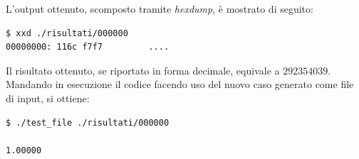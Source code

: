\documentclass[Lau, oneside]{sapthesis}%
\begin{document}
\newpage
L'output ottenuto, scomposto tramite \textit{hexdump}, è mostrato di seguito:
\begin{lstlisting}[xleftmargin=0\textwidth, language=bash]
$ xxd ./risultati/000000
00000000: 116c f7f7         ....
\end{lstlisting}
Il risultato ottenuto, se riportato in forma decimale, equivale a $292354039$.
\newline \newline
Mandando in esecuzione il codice facendo uso del nuovo caso generato come file di input, si ottiene:
\begin{lstlisting}[xleftmargin=0\textwidth, language=bash]
$ ./test_file ./risultati/000000

1.00000
\end{lstlisting}
\end{document}
